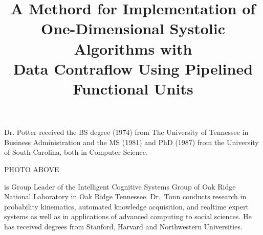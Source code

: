 \begin{article}
Dr. Potter received the BS degree (1974) from The University of
Tennessee in Business Administration and the MS (1981) and PhD (1987)
from the University of South Carolina, both in Computer Science.



\vspace*{1in}
PHOTO ABOVE

is Group Leader of the Intelligent Cognitive Systems
Group of Oak Ridge National Laboratory in Oak Ridge Tennessee. Dr.~Tonn 
conducts research in probability kinematics, automated knowledge
acquisition, and realtime expert systems as well as in applications
of advanced computing to social sciences. He has received degrees
from Stanford, Harvard and Northwestern Universities.

\end{article}







\setcounter{page}{7} %




\title{A Methord for Implementation of One-Dimensional Systolic Algorithms 
with\\
Data Contraflow Using Pipelined Functional Units}






